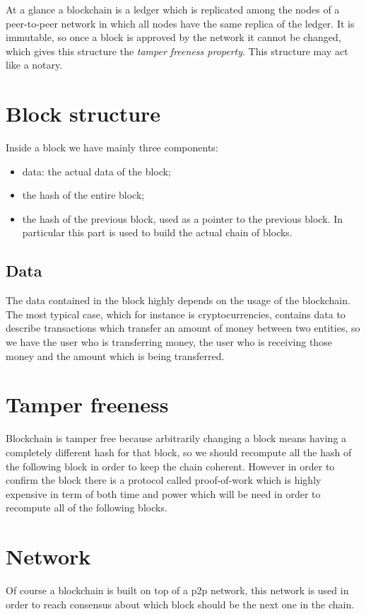 At a glance a blockchain is a ledger which is replicated among the nodes of a peer-to-peer network in which all nodes have the same replica of the ledger.
It is immutable, so once a block is approved by the network it cannot be changed, which gives this structure the \emph{tamper freeness property}.
This structure may act like a notary.

\section{Block structure}
Inside a block we have mainly three components:
\begin{itemize}
    \item data: the actual data of the block;
    \item the hash of the entire block;
    \item the hash of the previous block, used as a pointer to the previous block.
    In particular this part is used to build the actual chain of blocks.
\end{itemize}

\subsection{Data}
The data contained in the block highly depends on the usage of the blockchain.
The most typical case, which for instance is cryptocurrencies, contains data to describe transactions which transfer an amount of money between two entities, so we have the user who is transferring money, the user who is receiving those money and the amount which is being transferred.

\section{Tamper freeness}
Blockchain is tamper free because arbitrarily changing a block means having a completely different hash for that block, so we should recompute all the hash of the following block in order to keep the chain coherent.
However in order to confirm the block there is a protocol called proof-of-work which is highly expensive in term of both time and power which will be need in order to recompute all of the following blocks.

\section{Network}
Of course a blockchain is built on top of a p2p network, this network is used in order to reach consensus about which block should be the next one in the chain.

